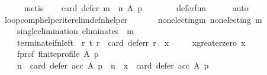 \begin{isabellebody}
\ \ \ \ \isamarkupfalse%
\ metis\isanewline
\ \ \isamarkupfalse%
\ {\isachardoublequoteopen}card\ {\isacharparenleft}{\kern0pt}defer\ {\isacharparenleft}{\kern0pt}m\ {\isasymtriangleright}\ n{\isacharparenright}{\kern0pt}\ A\ p{\isacharparenright}{\kern0pt}\ {\isacharequal}{\kern0pt}\ {}{\isachardoublequoteclose}\isanewline
\ \ \ \ \isamarkupfalse%
\ defer{\isacharunderscore}{\kern0pt}fun\isanewline
\ \ \ \ \isamarkupfalse%
\ auto\isanewline
{}\isamarkupfalse%
%
\endisatagproof
{\isafoldproof}%
%
\isadelimproof
\isanewline
%
\endisadelimproof
\isanewline
{}\isamarkupfalse%
\ loop{\isacharunderscore}{\kern0pt}comp{\isacharunderscore}{\kern0pt}helper{\isacharunderscore}{\kern0pt}iter{\isacharunderscore}{\kern0pt}elim{\isacharunderscore}{\kern0pt}def{\isacharunderscore}{\kern0pt}n{\isacharunderscore}{\kern0pt}helper{\isacharcolon}{\kern0pt}\isanewline
\ \ \isanewline
\ \ \ \ non{\isacharunderscore}{\kern0pt}electing{\isacharunderscore}{\kern0pt}m{\isacharcolon}{\kern0pt}\ {\isachardoublequoteopen}non{\isacharunderscore}{\kern0pt}electing\ m{\isachardoublequoteclose}\ \isanewline
\ \ \ \ single{\isacharunderscore}{\kern0pt}elimination{\isacharcolon}{\kern0pt}\ {\isachardoublequoteopen}eliminates\ {}\ m{\isachardoublequoteclose}\ \isanewline
\ \ \ \ terminate{\isacharunderscore}{\kern0pt}if{\isacharunderscore}{\kern0pt}n{\isacharunderscore}{\kern0pt}left{\isacharcolon}{\kern0pt}\ {\isachardoublequoteopen}{\isasymforall}\ r{\isachardot}{\kern0pt}\ {\isacharparenleft}{\kern0pt}{\isacharparenleft}{\kern0pt}t\ r{\isacharparenright}{\kern0pt}\ {\isasymlongleftrightarrow}\ {\isacharparenleft}{\kern0pt}card\ {\isacharparenleft}{\kern0pt}defer{\isacharunderscore}{\kern0pt}r\ r{\isacharparenright}{\kern0pt}\ {\isacharequal}{\kern0pt}\ x{\isacharparenright}{\kern0pt}{\isacharparenright}{\kern0pt}{\isachardoublequoteclose}\ \isanewline
\ \ \ \ x{\isacharunderscore}{\kern0pt}greater{\isacharunderscore}{\kern0pt}zero{\isacharcolon}{\kern0pt}\ {\isachardoublequoteopen}x\ {\isachargreater}{\kern0pt}\ {}{\isachardoublequoteclose}\ \isanewline
\ \ \ \ f{\isacharunderscore}{\kern0pt}prof{\isacharcolon}{\kern0pt}\ {\isachardoublequoteopen}finite{\isacharunderscore}{\kern0pt}profile\ A\ p{\isachardoublequoteclose}\isanewline
\ \ \isanewline
\ \ \ \ {\isachardoublequoteopen}{\isacharparenleft}{\kern0pt}n\ {\isacharequal}{\kern0pt}\ card\ {\isacharparenleft}{\kern0pt}defer\ acc\ A\ p{\isacharparenright}{\kern0pt}\ {\isasymand}\ n\ {\isasymge}\ x\ {\isasymand}\ card\ {\isacharparenleft}{\kern0pt}defer\ acc\ A\ p{\isacharparenright}{\kern0pt}\ {\isachargreater}{\kern0pt}\ {}\ {\isasymand}\isanewline

\end{isabellebody}
